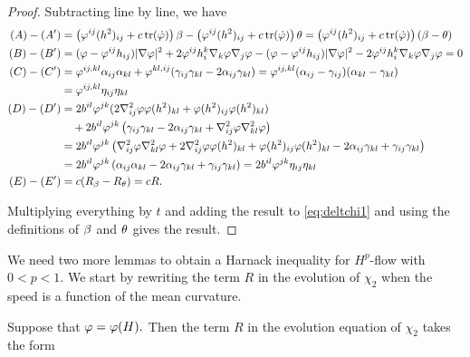 \documentclass{amsart}
\begin{document}
\begin{proof}
Subtracting line by line, we have
\begin{align*}
(A) - (A') &= \left(\varphi^{ij}(h^2)_{ij} + c\operatorname{tr}(\dot{\varphi}) \right)\beta - \left(\varphi^{ij}(h^2)_{ij} + c\operatorname{tr}(\dot{\varphi}) \right)\theta = \left(\varphi^{ij}(h^2)_{ij} + c\operatorname{tr}(\dot{\varphi}) \right)(\beta - \theta) \\
(B) - (B') &= (\varphi - \varphi^{ij}h_{ij}) |\nabla\varphi|^{2} + 2\varphi^{ij}h^{k}_{i}\nabla_k \varphi \nabla_j \varphi - (\varphi - \varphi^{ij}h_{ij})|\nabla\varphi|^{2} - 2\varphi^{ij}h^{k}_{i}\nabla_k\varphi\nabla_j\varphi = 0 \\
(C) - (C') &= \varphi^{ij,kl} \alpha_{ij} \alpha_{kl} + \varphi^{kl,ij} (\gamma_{ij}\gamma_{kl}  - 2\alpha_{ij} \gamma_{kl}) = \varphi^{ij,kl} (\alpha_{ij} - \gamma_{ij}) (\alpha_{kl} - \gamma_{kl}) \\
&= \varphi^{ij,kl} \eta_{ij} \eta_{kl} \\
(D) - (D') &= 2b^{il}\varphi^{jk} (2\nabla^2_{ij}\varphi\varphi(h^2)_{kl} + \varphi(h^2)_{ij}\varphi(h^2)_{kl}) \\
&\quad + 2b^{il} \varphi^{jk} \left(\gamma_{ij} \gamma_{kl} - 2\alpha_{ij} \gamma_{kl} + \nabla^2_{ij}\varphi\nabla^2_{kl}\varphi\right) \\
&= 2b^{il}\varphi^{jk} \left(\nabla^2_{ij}\varphi\nabla^2_{kl}\varphi +2\nabla^2_{ij}\varphi\varphi(h^2)_{kl} + \varphi(h^2)_{ij}\varphi(h^2)_{kl} - 2 \alpha_{ij} \gamma_{kl} + \gamma_{ij} \gamma_{kl} \right) \\
&= 2b^{il}\varphi^{jk} \left(\alpha_{ij}\alpha_{kl} - 2 \alpha_{ij} \gamma_{kl} + \gamma_{ij} \gamma_{kl} \right) = 2b^{il}\varphi^{jk} \eta_{ij} \eta_{kl} \\
(E) - (E') &= c(R_{\beta} - R_{\theta}) = cR.\\
\end{align*}

Multiplying everything by \(t\) and adding the result to \cref{eq:deltchi1} and using the definitions of $\beta$ and $\theta$ gives the result.
\end{proof}

We need two more lemmas to obtain a Harnack inequality for $H^{p}$-flow with $0<p<1.$  We start by rewriting the term $R$ in the evolution of \(\chi_2\) when the speed is a function of the mean curvature.

\begin{lemma}\label{RSphere}
Suppose that $\varphi=\varphi(H).$ Then the term $R$ in the evolution equation of $\chi_2$ takes the form
\end{lemma}
\end{document}

